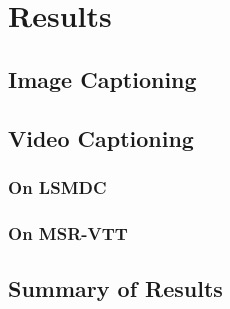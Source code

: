 \chapter{Results}
\label{chapter:results}

\section{Image Captioning}
\section{Video Captioning}
\subsection{On LSMDC}
\subsection{On MSR-VTT}
\section{Summary of Results}
